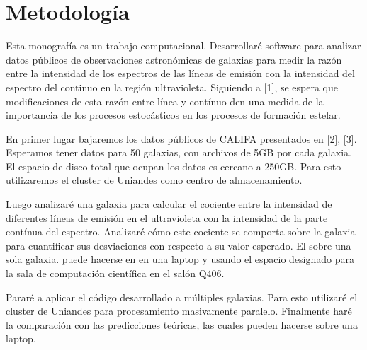 \documentclass[12pt]{article}
\begin{document}
\section{Metodolog\'ia}



Esta monograf\'ia es un trabajo computacional. Desarrollar\'e software
para analizar datos p\'ublicos de observaciones astron\'omicas de
galaxias para medir la raz\'on entre la intensidad de los espectros de las
l\'ineas de emisi\'on con la intensidad del espectro del continuo en
la regi\'on ultravioleta.  Siguiendo a [1], se espera que
modificaciones de esta raz\'on entre l\'inea y cont\'inuo den una medida de la importancia de
 los procesos estoc\'asticos en los procesos de formaci\'on estelar.

En primer lugar bajaremos los datos p\'ublicos de CALIFA presentados
en [2], [3].
Esperamos tener datos para 50 galaxias, con archivos de 5GB por cada
galaxia.
El espacio de disco total que ocupan los datos es cercano a 250GB.
Para esto utilizaremos el cluster de Uniandes como centro de
almacenamiento.

Luego analizar\'e una galaxia para calcular el cociente entre
la intensidad de diferentes l\'ineas de emisi\'on en el ultravioleta
con la intensidad de la parte cont\'inua del espectro.
Analizar\'e c\'omo este cociente se comporta sobre la galaxia para
cuantificar sus desviaciones con respecto a su valor esperado.
El sobre una sola galaxia. puede hacerse en  en una laptop y usando el
espacio designado para la sala de computaci\'on cient\'ifica en el
sal\'on Q406.

Parar\'e a aplicar el c\'odigo desarrollado a m\'ultiples galaxias.
Para esto utilizar\'e el cluster de Uniandes para procesamiento masivamente
paralelo.
Finalmente har\'e la comparaci\'on con las predicciones te\'oricas,
las cuales pueden hacerse sobre una laptop.


\end{document}
